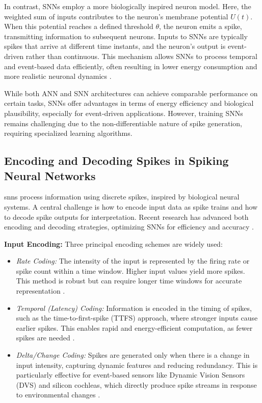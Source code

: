 In contrast, SNNs employ a more biologically inspired neuron model. Here, the weighted sum of inputs contributes to the neuron's membrane potential $U(t)$. When this potential reaches a defined threshold $\theta$, the neuron emits a spike, transmitting information to subsequent neurons. Inputs to SNNs are typically spikes that arrive at different time instants, and the neuron's output is event-driven rather than continuous. This mechanism allows SNNs to process temporal and event-based data efficiently, often resulting in lower energy consumption and more realistic neuronal dynamics \cite{Lin2024}.

While both ANN and SNN architectures can achieve comparable performance on certain tasks, SNNs offer advantages in terms of energy efficiency and biological plausibility, especially for event-driven applications. However, training SNNs remains challenging due to the non-differentiable nature of spike generation, requiring specialized learning algorithms.


\subsection{Encoding and Decoding Spikes in Spiking Neural Networks}

\glspl{snn} process information using discrete spikes, inspired by biological neural systems. A central challenge is how to encode input data as spike trains and how to decode spike outputs for interpretation. Recent research has advanced both encoding and decoding strategies, optimizing SNNs for efficiency and accuracy \cite{Zhou2024}.

\textbf{Input Encoding:}  
Three principal encoding schemes are widely used:
\begin{itemize}
    \item \textit{Rate Coding:} The intensity of the input is represented by the firing rate or spike count within a time window. Higher input values yield more spikes. This method is robust but can require longer time windows for accurate representation \cite{Zhou2024}.
    \item \textit{Temporal (Latency) Coding:} Information is encoded in the timing of spikes, such as the time-to-first-spike (TTFS) approach, where stronger inputs cause earlier spikes. This enables rapid and energy-efficient computation, as fewer spikes are needed \cite{Gu2024}.
    \item \textit{Delta/Change Coding:} Spikes are generated only when there is a change in input intensity, capturing dynamic features and reducing redundancy. This is particularly effective for event-based sensors like Dynamic Vision Sensors (DVS) and silicon cochleas, which directly produce spike streams in response to environmental changes \cite{Baek2024}.
\end{itemize}

